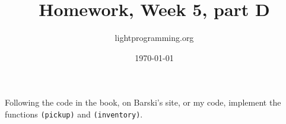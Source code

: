 \documentclass{article}
\title{Homework, Week 5, part D}
\author{lightprogramming.org}
\date{\today}
\begin{document}
\maketitle{}

Following the code in the book, on Barski's site, or my code, implement the functions \texttt{(pickup)} and \texttt{(inventory)}.
\end{document}
